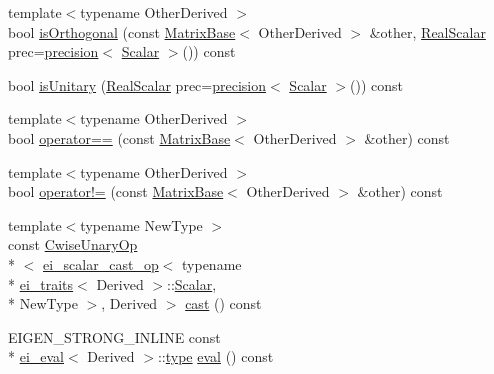 \begin{DoxyCompactItemize}
\item 
{\footnotesize template$<$typename Other\-Derived $>$ }\\bool \hyperlink{class_matrix_base_a5526846e28e94c3fe609ece4417d00a2}{is\-Orthogonal} (const \hyperlink{class_matrix_base}{Matrix\-Base}$<$ Other\-Derived $>$ \&other, \hyperlink{class_matrix_base_a634804c67de40fec74e3640bc229364c}{Real\-Scalar} prec=\hyperlink{_math_functions_8h_a3dc1c65cf9dc9b5a7ee66472d0ae83e1}{precision}$<$ \hyperlink{class_matrix_base_a625df8339dc2d816cbc0fd66e7dadaf5}{Scalar} $>$()) const 
\item 
bool \hyperlink{class_matrix_base_a7d284ed351138bc583d225530c1c86e4}{is\-Unitary} (\hyperlink{class_matrix_base_a634804c67de40fec74e3640bc229364c}{Real\-Scalar} prec=\hyperlink{_math_functions_8h_a3dc1c65cf9dc9b5a7ee66472d0ae83e1}{precision}$<$ \hyperlink{class_matrix_base_a625df8339dc2d816cbc0fd66e7dadaf5}{Scalar} $>$()) const 
\item 
{\footnotesize template$<$typename Other\-Derived $>$ }\\bool \hyperlink{class_matrix_base_a4a2225af2517a0b494dba8b48cceec56}{operator==} (const \hyperlink{class_matrix_base}{Matrix\-Base}$<$ Other\-Derived $>$ \&other) const 
\item 
{\footnotesize template$<$typename Other\-Derived $>$ }\\bool \hyperlink{class_matrix_base_a31e62c88945c630e13f7ee31060c54e0}{operator!=} (const \hyperlink{class_matrix_base}{Matrix\-Base}$<$ Other\-Derived $>$ \&other) const 
\item 
{\footnotesize template$<$typename New\-Type $>$ }\\const \hyperlink{class_cwise_unary_op}{Cwise\-Unary\-Op}\\*
$<$ \hyperlink{structei__scalar__cast__op}{ei\-\_\-scalar\-\_\-cast\-\_\-op}$<$ typename \\*
\hyperlink{structei__traits}{ei\-\_\-traits}$<$ Derived $>$\-::\hyperlink{class_matrix_base_a625df8339dc2d816cbc0fd66e7dadaf5}{Scalar}, \\*
New\-Type $>$, Derived $>$ \hyperlink{class_matrix_base_a12c1b7436779ad7106da4565c973fcee}{cast} () const 
\item 
E\-I\-G\-E\-N\-\_\-\-S\-T\-R\-O\-N\-G\-\_\-\-I\-N\-L\-I\-N\-E const \\*
\hyperlink{classei__eval}{ei\-\_\-eval}$<$ Derived $>$\-::\hyperlink{glext_8h_a7d05960f4f1c1b11f3177dc963a45d86}{type} \hyperlink{class_matrix_base_a15066e6adba1a119e7f634a47ac49e17}{eval} () const 
\item 

\end{DoxyCompactItemize}
